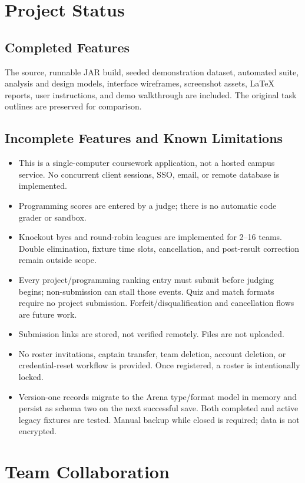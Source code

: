 \documentclass[12pt]{article}
\begin{document}
\section{Project Status}
\subsection{Completed Features}
The source, runnable JAR build, seeded demonstration dataset, automated suite, analysis and design models, interface wireframes, screenshot assets, LaTeX reports, user instructions, and demo walkthrough are included. The original task outlines are preserved for comparison.
\subsection{Incomplete Features and Known Limitations}
\begin{itemize}
\item This is a single-computer coursework application, not a hosted campus service. No concurrent client sessions, SSO, email, or remote database is implemented.
\item Programming scores are entered by a judge; there is no automatic code grader or sandbox.
\item Knockout byes and round-robin leagues are implemented for 2--16 teams. Double elimination, fixture time slots, cancellation, and post-result correction remain outside scope.
\item Every project/programming ranking entry must submit before judging begins; non-submission can stall those events. Quiz and match formats require no project submission. Forfeit/disqualification and cancellation flows are future work.
\item Submission links are stored, not verified remotely. Files are not uploaded.
\item No roster invitations, captain transfer, team deletion, account deletion, or credential-reset workflow is provided. Once registered, a roster is intentionally locked.
\item Version-one records migrate to the Arena type/format model in memory and persist as schema two on the next successful save. Both completed and active legacy fixtures are tested. Manual backup while closed is required; data is not encrypted.
\end{itemize}

\clearpage\section{Team Collaboration}
\end{document}
